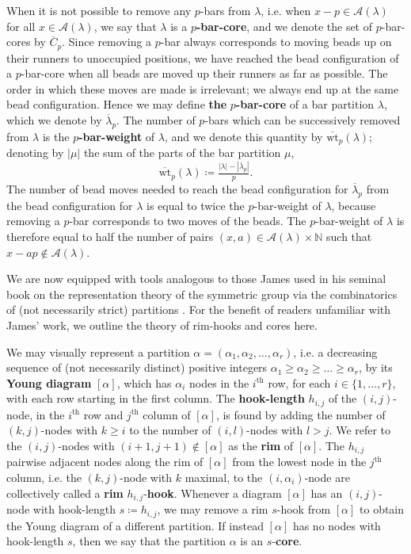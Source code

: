 \documentclass[10pt]{amsart}
\begin{document}
When it is not possible to remove any $p$-bars from $\lambda$, i.e. when $x-p\in\mathcal{A}(\lambda)$ for all $x\in\mathcal{A}(\lambda)$, we say that $\lambda$ is a $p$\textbf{-bar-core}, and we denote the set of $p$-bar-cores by $\overline{C}_p$. 
\newline
Since removing a $p$-bar always corresponds to moving beads up on their runners to unoccupied positions, we have reached the bead configuration of a $p$-bar-core when all beads are moved up their runners as far as possible. 
The order in which these moves are made is irrelevant; we always end up at the same bead configuration. 
Hence we may define \textbf{the} $p$\textbf{-bar-core} of a bar partition $\lambda$, which we denote by $\overline{\lambda}_p$. 
The number of $p$-bars which can be successively removed from $\lambda$ is the $p$\textbf{-bar-weight} of $\lambda$, and we denote this quantity by $\overline{\text{wt}}_p(\lambda)$; denoting by $|\mu|$ the sum of the parts of the bar partition $\mu$, 
$$\overline{\text{wt}}_p(\lambda)\coloneqq\tfrac{|\lambda|-|\overline{\lambda}_p|}{p}.$$ 
The number of bead moves needed to reach the bead configuration for $\overline{\lambda}_p$ from the bead configuration for $\lambda$ is equal to twice the $p$-bar-weight of $\lambda$, because removing a $p$-bar corresponds to two moves of the beads. 
The $p$-bar-weight of $\lambda$ is therefore equal to half the number of pairs $(x,a)\in\mathcal{A}(\lambda)\times\mathbb{N}$ such that $x-ap\not\in\mathcal{A}(\lambda)$. 


We are now equipped with tools analogous to those James used in his seminal book on the representation theory of the symmetric group via the combinatorics of (not necessarily strict) partitions \cite{JK}. For the benefit of readers unfamiliar with James' work, we outline the theory of rim-hooks and cores here.

We may visually represent a partition $\alpha=(\alpha_1,\alpha_2,\dots,\alpha_r)$, i.e. a decreasing sequence of (not necessarily distinct) positive integers $\alpha_1\geq\alpha_2\geq\dots\geq\alpha_r$, by its \textbf{Young diagram} $[\alpha]$, which has $\alpha_i$  nodes in the $i^\text{th}$ row, for each $i\in\{1,\dots,r\}$, with each row starting in the first column. The \textbf{hook-length} $h_{i,j}$ of the $(i,j)$-node, in the $i^\text{th}$ row and $j^\text{th}$ column of $[\alpha]$, is found by adding the number of $(k,j)$-nodes with $k\geq i$ to the number of $(i,l)$-nodes with $l>j$. We refer to the $(i,j)$-nodes with $(i+1,j+1)\not\in[\alpha]$ as the \textbf{rim} of $[\alpha]$. 
The $h_{i,j}$ pairwise adjacent nodes along the rim of $[\alpha]$ from the lowest node in the $j^\text{th}$ column, i.e. the $(k,j)$-node with $k$ maximal, to the $(i,\alpha_i)$-node are collectively called a \textbf{rim} $h_{i,j}$-\textbf{hook}. Whenever a diagram $[\alpha]$ has an $(i,j)$-node with hook-length $s\coloneqq h_{i,j}$, we may remove a rim $s$-hook from $[\alpha]$ to obtain the Young diagram of a different partition. If instead $[\alpha]$ has no nodes with hook-length $s$, then we say that the partition $\alpha$ is an $s$-\textbf{core}. 
\end{document}

